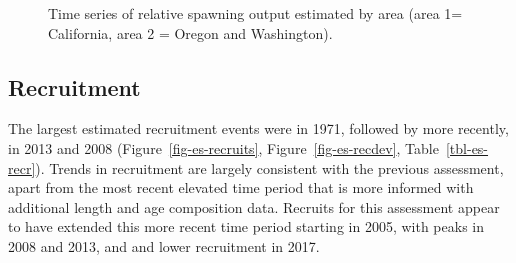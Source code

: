 \documentclass[
]{scrartcl}
\begin{document}
\begin{figure}[H]


\caption{\label{fig-status-area-es}Time series of relative spawning
output estimated by area (area 1= California, area 2 = Oregon and
Washington).}

\end{figure}%

\clearpage

\subsection*{Recruitment}\label{recruitment}

The largest estimated recruitment events were in 1971, followed by more
recently, in 2013 and 2008 (Figure~\ref{fig-es-recruits},
Figure~\ref{fig-es-recdev}, Table~\ref{tbl-es-recr}). Trends in
recruitment are largely consistent with the previous assessment, apart
from the most recent elevated time period that is more informed with
additional length and age composition data. Recruits for this assessment
appear to have extended this more recent time period starting in 2005,
with peaks in 2008 and 2013, and and lower recruitment in 2017.

\begingroup
\fontsize{9.0pt}{10.8pt}\selectfont
\end{document}
